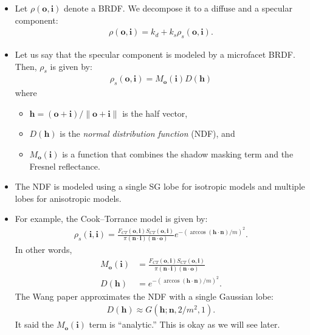 \documentclass[10pt]{article}
\newcommand{\ve}[1]{\mathbf{#1}}
\begin{document}
  \begin{itemize}
    \item Let $\rho(\ve{o}, \ve{i})$ denote a BRDF.  We decompose it to a diffuse and a specular component:
    \begin{align*}
      \rho(\ve{o}, \ve{i}) = k_d + k_s \rho_s(\ve{o}, \ve{i}).
    \end{align*}

    \item Let us say that the specular component is modeled by a microfacet BRDF.  Then, $\rho_s$ is given by:
    \begin{align*}
      \rho_s(\ve{o}, \ve{i}) = M_\ve{o}(\ve{i}) D(\ve{h})
    \end{align*}
    where 
    \begin{itemize}
      \item $\ve{h} = (\ve{o} + \ve{i}) / \| \ve{o} + \ve{i} \|$ is the half vector,
      \item $D(\ve{h})$ is the \emph{normal distribution function} (NDF), and
      \item $M_\ve{o}(\ve{i})$ is a function that combines the shadow masking term and the Fresnel reflectance.
    \end{itemize}

    \item The NDF is modeled using a single SG lobe for isotropic models and multiple lobes for anisotropic models.

    \item For example, the Cook--Torrance model is given by:
    \begin{align*}
      \rho_s(\ve{i}, \ve{i}) = \frac{F_{CT}(\ve{o},\ve{i}) S_{CT}(\ve{o},\ve{i})}{\pi (\ve{n} \cdot \ve{i}) (\ve{n} \cdot \ve{o})} e^{-(\arccos(\ve{h} \cdot \ve{n}) /m)^2}.
    \end{align*}
    In other words,
    \begin{align*}
      M_{\ve{o}}(\ve{i}) &= \frac{F_{CT}(\ve{o},\ve{i}) S_{CT}(\ve{o},\ve{i})}{\pi (\ve{n} \cdot \ve{i}) (\ve{n} \cdot \ve{o})} \\
      D(\ve{h}) &= e^{-(\arccos(\ve{h} \cdot \ve{n}) / m)^2}.
    \end{align*}
    The Wang paper approximates the NDF with a single Gaussian lobe:
    \begin{align*}
      D(\ve{h}) \approx G(\ve{h}; \ve{n},2/m^2,1).
    \end{align*}
    It said the $M_{\ve{o}}(\ve{i})$ term is ``analytic.''  This is okay as we will see later.
    

\end{itemize}
\end{document}
